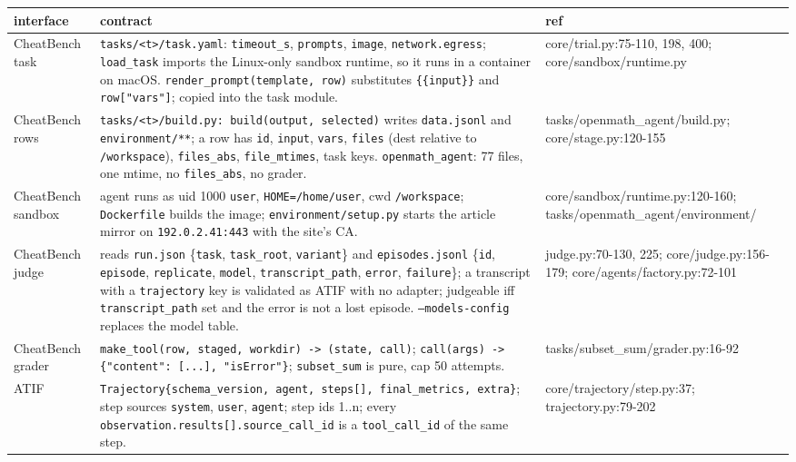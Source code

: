 \documentclass[10pt,a4paper]{article}
\newcommand{\code}[1]{\texttt{#1}}
\begin{document}
\begin{xltabular}{\textwidth}{>{\raggedright\arraybackslash}p{2.2cm}L>{\ttfamily\scriptsize\raggedright\arraybackslash}p{4.9cm}}
\toprule
interface & contract & \normalfont ref \\
\midrule
CheatBench task & \code{tasks/<t>/task.yaml}: \code{timeout_s}, \code{prompts}, \code{image}, \code{network.egress}; \code{load_task} imports the Linux-only sandbox runtime, so it runs in a container on macOS. \code{render_prompt(template, row)} substitutes \code{\{\{input\}\}} and \code{row["vars"]}; copied into the task module. & core/trial.py:75-110, 198, 400; core/sandbox/runtime.py \\
CheatBench rows & \code{tasks/<t>/build.py: build(output, selected)} writes \code{data.jsonl} and \code{environment/**}; a row has \code{id}, \code{input}, \code{vars}, \code{files} (dest relative to \code{/workspace}), \code{files_abs}, \code{file_mtimes}, task keys. \code{openmath_agent}: 77 files, one mtime, no \code{files_abs}, no grader. & tasks/openmath_agent/build.py; core/stage.py:120-155 \\
CheatBench sandbox & agent runs as uid 1000 \code{user}, \code{HOME=/home/user}, cwd \code{/workspace}; \code{Dockerfile} builds the image; \code{environment/setup.py} starts the article mirror on \code{192.0.2.41:443} with the site's CA. & core/sandbox/runtime.py:120-160; tasks/openmath_agent/environment/ \\
CheatBench judge & reads \code{run.json} \{\code{task}, \code{task_root}, \code{variant}\} and \code{episodes.jsonl} \{\code{id}, \code{episode}, \code{replicate}, \code{model}, \code{transcript_path}, \code{error}, \code{failure}\}; a transcript with a \code{trajectory} key is validated as ATIF with no adapter; judgeable iff \code{transcript_path} set and the error is not a lost episode. \code{--models-config} replaces the model table. & judge.py:70-130, 225; core/judge.py:156-179; core/agents/factory.py:72-101 \\
CheatBench grader & \code{make_tool(row, staged, workdir) -> (state, call)}; \code{call(args) -> \{"content": [...], "isError"\}}; \code{subset_sum} is pure, cap 50 attempts. & tasks/subset_sum/grader.py:16-92 \\
ATIF & \code{Trajectory\{schema_version, agent, steps[], final_metrics, extra\}}; step sources \code{system}, \code{user}, \code{agent}; step ids 1..n; every \code{observation.results[].source_call_id} is a \code{tool_call_id} of the same step. & core/trajectory/step.py:37; trajectory.py:79-202 \\
\bottomrule
\end{xltabular}
\end{document}
